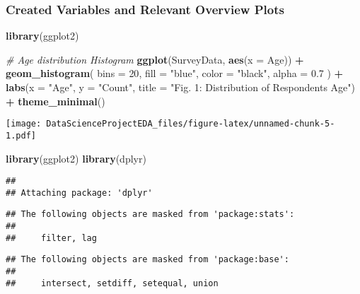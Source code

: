 \documentclass[
]{article}
\newenvironment{Shaded}{\begin{snugshade}}{\end{snugshade}}
\newcommand{\AttributeTok}[1]{\textcolor[rgb]{0.13,0.29,0.53}{#1}}
\newcommand{\CommentTok}[1]{\textcolor[rgb]{0.56,0.35,0.01}{\textit{#1}}}
\newcommand{\DecValTok}[1]{\textcolor[rgb]{0.00,0.00,0.81}{#1}}
\newcommand{\FloatTok}[1]{\textcolor[rgb]{0.00,0.00,0.81}{#1}}
\newcommand{\FunctionTok}[1]{\textcolor[rgb]{0.13,0.29,0.53}{\textbf{#1}}}
\newcommand{\NormalTok}[1]{#1}
\newcommand{\SpecialCharTok}[1]{\textcolor[rgb]{0.81,0.36,0.00}{\textbf{#1}}}
\newcommand{\StringTok}[1]{\textcolor[rgb]{0.31,0.60,0.02}{#1}}
\begin{document}
\hypertarget{created-variables-and-relevant-overview-plots}{%
\subsubsection{Created Variables and Relevant Overview
Plots}\label{created-variables-and-relevant-overview-plots}}

\begin{Shaded}
\begin{Highlighting}[]
\FunctionTok{library}\NormalTok{(ggplot2)}

\CommentTok{\# Age distribution Histogram}
\FunctionTok{ggplot}\NormalTok{(SurveyData, }\FunctionTok{aes}\NormalTok{(}\AttributeTok{x =}\NormalTok{ Age)) }\SpecialCharTok{+}
  \FunctionTok{geom\_histogram}\NormalTok{(}
    \AttributeTok{bins =} \DecValTok{20}\NormalTok{,}
    \AttributeTok{fill =} \StringTok{"blue"}\NormalTok{,}
    \AttributeTok{color =} \StringTok{"black"}\NormalTok{,}
    \AttributeTok{alpha =} \FloatTok{0.7}
\NormalTok{  ) }\SpecialCharTok{+}
  \FunctionTok{labs}\NormalTok{(}\AttributeTok{x =} \StringTok{"Age"}\NormalTok{, }\AttributeTok{y =} \StringTok{"Count"}\NormalTok{, }\AttributeTok{title =} \StringTok{"Fig. 1: Distribution of Respondents\textquotesingle{} Age"}\NormalTok{) }\SpecialCharTok{+}
  \FunctionTok{theme\_minimal}\NormalTok{()}
\end{Highlighting}
\end{Shaded}

\texttt{[image: DataScienceProjectEDA\_files/figure-latex/unnamed-chunk-5-1.pdf]}

\begin{Shaded}
\begin{Highlighting}[]
\FunctionTok{library}\NormalTok{(ggplot2)}
\FunctionTok{library}\NormalTok{(dplyr)}
\end{Highlighting}
\end{Shaded}

\begin{verbatim}
## 
## Attaching package: 'dplyr'
\end{verbatim}

\begin{verbatim}
## The following objects are masked from 'package:stats':
## 
##     filter, lag
\end{verbatim}

\begin{verbatim}
## The following objects are masked from 'package:base':
## 
##     intersect, setdiff, setequal, union
\end{verbatim}
\end{document}
